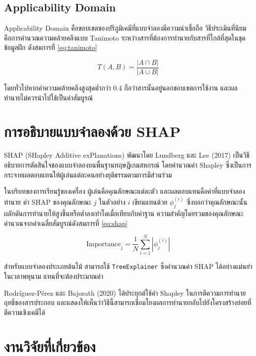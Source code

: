 \subsection{Applicability Domain}

Applicability Domain คือขอบเขตของปริภูมิเคมีที่แบบจำลองมีความน่าเชื่อถือ วิธีประเมินที่นิยมคือการคำนวณความคล้ายคลึงแบบ Tanimoto ระหว่างสารที่ต้องการทำนายกับสารที่ใกล้ที่สุดในชุดข้อมูลฝึก ดังสมการที่ \ref{eq:tanimoto}

\begin{equation}
T(A,B) = \frac{|A \cap B|}{|A \cup B|}
\label{eq:tanimoto}
\end{equation}

โดยทั่วไปหากค่าความคล้ายคลึงสูงสุดต่ำกว่า 0.4 ถือว่าสารนั้นอยู่นอกขอบเขตการใช้งาน และผลทำนายไม่ควรนำไปใช้เป็นค่าสัมบูรณ์

\section{การอธิบายแบบจำลองด้วย SHAP}

SHAP (SHapley Additive exPlanations) พัฒนาโดย Lundberg และ Lee (2017) เป็นวิธีอธิบายการตัดสินใจของแบบจำลองบนพื้นฐานทฤษฎีเกมสหกรณ์ โดยคำนวณค่า Shapley ซึ่งเป็นการกระจายผลตอบแทนให้ผู้เล่นแต่ละคนอย่างยุติธรรมตามการมีส่วนร่วม

ในบริบทของการเรียนรู้ของเครื่อง ผู้เล่นคือคุณลักษณะแต่ละตัว และผลตอบแทนคือค่าที่แบบจำลองทำนาย ค่า SHAP ของคุณลักษณะ $j$ ในตัวอย่าง $i$ เขียนแทนด้วย $\phi_j^{(i)}$ ซึ่งบอกว่าคุณลักษณะนั้นผลักดันการทำนายให้สูงขึ้นหรือต่ำลงเท่าใดเมื่อเทียบกับค่าฐาน ความสำคัญโดยรวมของคุณลักษณะคำนวณจากค่าเฉลี่ยสัมบูรณ์ดังสมการที่ \ref{eq:shap}

\begin{equation}
\mathrm{Importance}_j = \frac{1}{N}\sum_{i=1}^{N}\left|\phi_j^{(i)}\right|
\label{eq:shap}
\end{equation}

สำหรับแบบจำลองประเภทต้นไม้ สามารถใช้ \texttt{TreeExplainer} ซึ่งคำนวณค่า SHAP ได้อย่างแม่นยำในเวลาพหุนาม แทนที่จะต้องประมาณค่า

Rodríguez-Pérez และ Bajorath (2020) ได้ประยุกต์ใช้ค่า Shapley ในการตีความการทำนายฤทธิ์ของสารประกอบ และแสดงให้เห็นว่าวิธีนี้สามารถเชื่อมโยงผลการทำนายกลับไปยังโครงสร้างย่อยที่ตีความเชิงเคมีได้

\section{งานวิจัยที่เกี่ยวข้อง}

